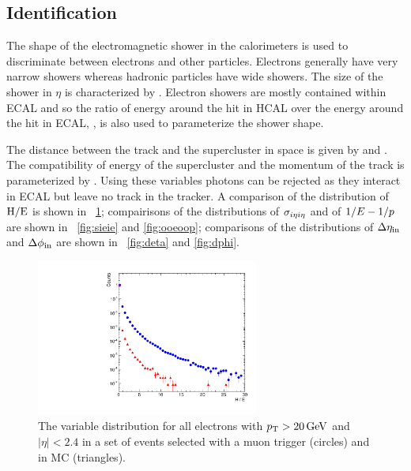 \subsection{Identification}

The shape of the electromagnetic shower in the calorimeters is used to
discriminate between electrons and other particles. Electrons generally have
very narrow showers whereas hadronic particles have wide showers. The size of
the shower in $\eta$ is characterized by \sigmaietaieta. Electron showers are
mostly contained within ECAL and so the ratio of energy around the hit in HCAL
over the energy around the hit in ECAL, \HOverE, is also used to parameterize
the shower shape.

The distance between the track and the supercluster in \coordetaphi space is
given by \dphiin and \detain. The compatibility of energy of the supercluster
and the momentum of the track is parameterized by \ooeoop. Using these
variables photons can be rejected as they interact in ECAL but leave no track
in the tracker. A comparison of the distribution of $\text{H}/\text{E}$ is shown in
\FIG~\ref{fig:he}; compairisons of the distributions of $\sigma_{i \eta i \eta}$ and of
$1/E - 1/p$ are shown in \FIGS~\ref{fig:sieie} and \ref{fig:ooeoop}; comparisons
of the distributions of $\Delta \eta_{\text{in}}$ and $\Delta \phi_{\text{in}}$ are shown in
\FIGS~\ref{fig:deta} and \ref{fig:dphi}.

\begin{figure}[!htbp]
    \centering
    \includegraphics[width=0.65\textwidth]{figures/he.pdf}
    \caption[
        Distributions of \HOverE variable in data and MC.
    ]{
        The \HOverE variable distribution for all electrons with $p_{\mathrm{T}} > 20
        \,\text{Ge\hspace{-.08em}V}$ and $|\eta| < 2.4$ in a set of events selected with a muon
        trigger (circles) and in \MADGRAPH \Ztoee MC (triangles).
    }
    \label{fig:he}
\end{figure}

